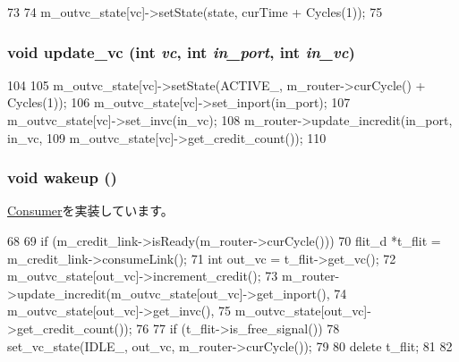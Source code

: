 \begin{DoxyCode}
73     {
74         m_outvc_state[vc]->setState(state, curTime + Cycles(1));
75     }
\end{DoxyCode}
\hypertarget{classOutputUnit__d_a86be419f132f77f0bec3a6061db90b56}{
\subsubsection[{update\_\-vc}]{\setlength{\rightskip}{0pt plus 5cm}void update\_\-vc (int {\em vc}, \/  int {\em in\_\-port}, \/  int {\em in\_\-vc})}}
\label{classOutputUnit__d_a86be419f132f77f0bec3a6061db90b56}



\begin{DoxyCode}
104 {
105     m_outvc_state[vc]->setState(ACTIVE_, m_router->curCycle() + Cycles(1));
106     m_outvc_state[vc]->set_inport(in_port);
107     m_outvc_state[vc]->set_invc(in_vc);
108     m_router->update_incredit(in_port, in_vc,
109                               m_outvc_state[vc]->get_credit_count());
110 }
\end{DoxyCode}
\hypertarget{classOutputUnit__d_ae674290a26ecbd622c5160e38e8a4fe9}{
\subsubsection[{wakeup}]{\setlength{\rightskip}{0pt plus 5cm}void wakeup ()}}
\label{classOutputUnit__d_ae674290a26ecbd622c5160e38e8a4fe9}


\hyperlink{classConsumer_a623e3e7d1b1c725d70009f7b01a421b9}{Consumer}を実装しています。


\begin{DoxyCode}
68 {
69     if (m_credit_link->isReady(m_router->curCycle())) {
70         flit_d *t_flit = m_credit_link->consumeLink();
71         int out_vc = t_flit->get_vc();
72         m_outvc_state[out_vc]->increment_credit();
73         m_router->update_incredit(m_outvc_state[out_vc]->get_inport(),
74                                   m_outvc_state[out_vc]->get_invc(),
75                                   m_outvc_state[out_vc]->get_credit_count());
76 
77         if (t_flit->is_free_signal())
78             set_vc_state(IDLE_, out_vc, m_router->curCycle());
79 
80         delete t_flit;
81     }
82 }
\end{DoxyCode}


